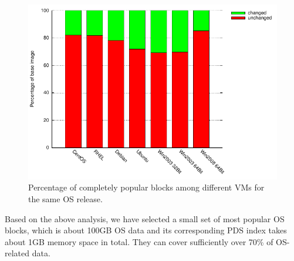 
\begin{figure}
\centering
\includegraphics[width=5in]{images/os_subset.pdf}
\caption{Percentage of completely popular blocks among different VMs for the same OS release.}
\label{fig:OSunchanged}
\end{figure}

Based on the above analysis, we have selected a small set of most popular
OS blocks, which is about 100GB OS data and its corresponding PDS index takes about 1GB memory space in total.
They can cover sufficiently over 70\% of OS-related data.






